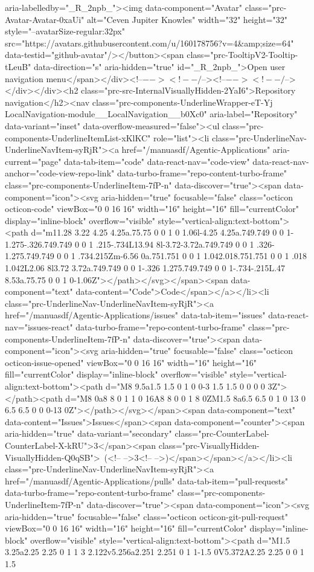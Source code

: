 {{aria-labelledby="_R_2npb_"><img data-component="Avatar" class="prc-Avatar-Avatar-0xaUi" alt="Ceven Jupiter Knowles" width="32" height="32" style="--avatarSize-regular:32px" src="https://avatars.githubusercontent.com/u/160178756?v=4&amp;size=64" data-testid="github-avatar"/></button><span class="prc-TooltipV2-Tooltip-tLeuB" data-direction="s" aria-hidden="true" id="_R_2npb_">Open user navigation menu</span></div><!--$--><!--/$--><!--$--><!--/$--></div></div><h2 class="prc-src-InternalVisuallyHidden-2YaI6">Repository navigation</h2><nav class="prc-components-UnderlineWrapper-eT-Yj LocalNavigation-module__LocalNavigation__b0Xc0" aria-label="Repository" data-variant="inset" data-overflow-measured="false"><ul class="prc-components-UnderlineItemList-xKlKC" role="list"><li class="prc-UnderlineNav-UnderlineNavItem-syRjR"><a href="/manuasdf/Agentic-Applications" aria-current="page" data-tab-item="code" data-react-nav="code-view" data-react-nav-anchor="code-view-repo-link" data-turbo-frame="repo-content-turbo-frame" class="prc-components-UnderlineItem-7fP-n" data-discover="true"><span data-component="icon"><svg aria-hidden="true" focusable="false" class="octicon octicon-code" viewBox="0 0 16 16" width="16" height="16" fill="currentColor" display="inline-block" overflow="visible" style="vertical-align:text-bottom"><path d="m11.28 3.22 4.25 4.25a.75.75 0 0 1 0 1.06l-4.25 4.25a.749.749 0 0 1-1.275-.326.749.749 0 0 1 .215-.734L13.94 8l-3.72-3.72a.749.749 0 0 1 .326-1.275.749.749 0 0 1 .734.215Zm-6.56 0a.751.751 0 0 1 1.042.018.751.751 0 0 1 .018 1.042L2.06 8l3.72 3.72a.749.749 0 0 1-.326 1.275.749.749 0 0 1-.734-.215L.47 8.53a.75.75 0 0 1 0-1.06Z"></path></svg></span><span data-component="text" data-content="Code">Code</span></a></li><li class="prc-UnderlineNav-UnderlineNavItem-syRjR"><a href="/manuasdf/Agentic-Applications/issues" data-tab-item="issues" data-react-nav="issues-react" data-turbo-frame="repo-content-turbo-frame" class="prc-components-UnderlineItem-7fP-n" data-discover="true"><span data-component="icon"><svg aria-hidden="true" focusable="false" class="octicon octicon-issue-opened" viewBox="0 0 16 16" width="16" height="16" fill="currentColor" display="inline-block" overflow="visible" style="vertical-align:text-bottom"><path d="M8 9.5a1.5 1.5 0 1 0 0-3 1.5 1.5 0 0 0 0 3Z"></path><path d="M8 0a8 8 0 1 1 0 16A8 8 0 0 1 8 0ZM1.5 8a6.5 6.5 0 1 0 13 0 6.5 6.5 0 0 0-13 0Z"></path></svg></span><span data-component="text" data-content="Issues">Issues</span><span data-component="counter"><span aria-hidden="true" data-variant="secondary" class="prc-CounterLabel-CounterLabel-X-kRU">3</span><span class="prc-VisuallyHidden-VisuallyHidden-Q0qSB"> (<!-- -->3<!-- -->)</span></span></a></li><li class="prc-UnderlineNav-UnderlineNavItem-syRjR"><a href="/manuasdf/Agentic-Applications/pulls" data-tab-item="pull-requests" data-turbo-frame="repo-content-turbo-frame" class="prc-components-UnderlineItem-7fP-n" data-discover="true"><span data-component="icon"><svg aria-hidden="true" focusable="false" class="octicon octicon-git-pull-request" viewBox="0 0 16 16" width="16" height="16" fill="currentColor" display="inline-block" overflow="visible" style="vertical-align:text-bottom"><path d="M1.5 3.25a2.25 2.25 0 1 1 3 2.122v5.256a2.251 2.251 0 1 1-1.5 0V5.372A2.25 2.25 0 0 1 1.5 }}
